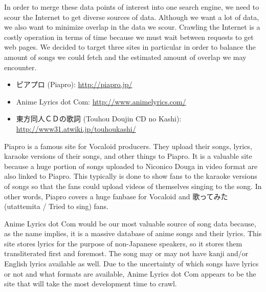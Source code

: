 \documentclass{acm} %
\begin{document}
\begin{CJK}{UTF8}{zhsong}

In order to merge these data points of interest into one search engine, we need to scour the Internet to get diverse sources of data. Although we want a lot of data, we also want to minimize overlap in the data we scour. Crawling the Internet is a costly operation in terms of time because we must wait between requests to get web pages. We decided to target three sites in particular in order to balance the amount of songs we could fetch and the estimated amount of overlap we may encounter.

\begin{itemize}
\item ピアプロ (Piapro): \url{http://piapro.jp/}
\item Anime Lyrics dot Com: \url{http://www.animelyrics.com/}
\item 東方同人ＣＤの歌詞 (Touhou Doujin CD no Kashi): \url{http://www31.atwiki.jp/touhoukashi/}
\end{itemize}

Piapro is a famous site for Vocaloid producers. They upload their songs, lyrics, karaoke versions of their songs, and other things to Piapro. It is a valuable site because a huge portion of songs uploaded to Niconico Douga in video format are also linked to Piapro. This typically is done to show fans to the karaoke versions of songs so that the fans could upload videos of themselves singing to the song. In other words, Piapro covers a huge fanbase for Vocaloid and 歌ってみた (utattemita / Tried to sing) fans.

Anime Lyrics dot Com would be our most valuable source of song data because, as the name implies, it is a massive database of anime songs and their lyrics. This site stores lyrics for the purpose of non-Japanese speakers, so it stores them transliterated first and foremost. The song may or may not have kanji and/or English lyrics available as well. Due to the uncertainty of which songs have lyrics or not and what formats are available, Anime Lyrics dot Com appears to be the site that will take the most development time to crawl.


\end{CJK}
\end{document}
